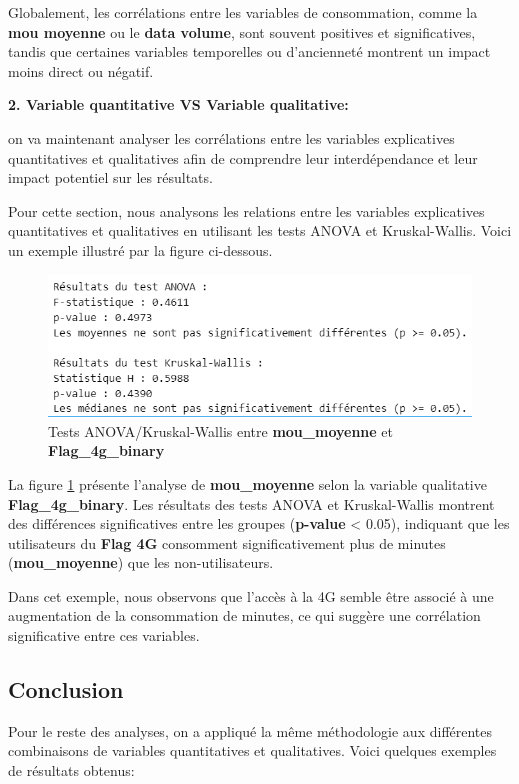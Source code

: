 Globalement, les corrélations entre les variables de consommation, comme la \textbf{mou moyenne} ou le \textbf{data volume}, sont souvent positives et significatives, tandis que certaines variables temporelles ou d'ancienneté montrent un impact moins direct ou négatif.

\textbf{2. Variable quantitative VS Variable qualitative:}

on va maintenant analyser les corrélations entre les variables explicatives quantitatives et qualitatives afin de comprendre leur interdépendance et leur impact potentiel sur les résultats.

Pour cette section, nous analysons les relations entre les variables explicatives quantitatives et qualitatives en utilisant les tests ANOVA et Kruskal-Wallis. Voici un exemple illustré par la figure ci-dessous.

\begin{figure}[H]
    \centering
    \includegraphics[width=0.7\linewidth]{capture_sas_36.png}
    \caption{Tests ANOVA/Kruskal-Wallis entre \textbf{mou\_moyenne} et \textbf{Flag\_4g\_binary}}
    \label{flag4g_mou}
\end{figure}

La figure \ref{flag4g_mou} présente l'analyse de \textbf{mou\_moyenne} selon la variable qualitative \textbf{Flag\_4g\_binary}. Les résultats des tests ANOVA et Kruskal-Wallis montrent des différences significatives entre les groupes (\textbf{p-value} < 0.05), indiquant que les utilisateurs du \textbf{Flag 4G} consomment significativement plus de minutes (\textbf{mou\_moyenne}) que les non-utilisateurs.

Dans cet exemple, nous observons que l'accès à la 4G semble être associé à une augmentation de la consommation de minutes, ce qui suggère une corrélation significative entre ces variables.

\subsection*{Conclusion }
Pour le reste des analyses, on a appliqué la même méthodologie aux différentes combinaisons de variables quantitatives et qualitatives. Voici quelques exemples de résultats obtenus:

